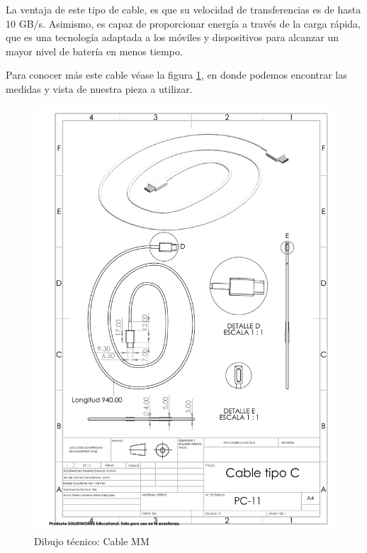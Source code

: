     La ventaja de este tipo de cable, es que su velocidad de transferencias es de hasta 10 GB/s. Asimismo, es capaz de proporcionar energía a través de la carga rápida, que es una tecnología adaptada a los móviles y dispositivos para alcanzar un mayor nivel de batería en menos tiempo.
    
    Para conocer más este cable véase la figura \ref{fig:cableC}, en donde podemos encontrar las medidas y vista de nuestra pieza a utilizar. 
    
    \begin{figure}[H]
        \centering
        \includegraphics[trim = {7mm 1mm 1mm 1mm},clip,scale=0.4]{22/Img/cableCDibujo.PDF}
        \caption{Dibujo técnico: Cable MM}
        \label{fig:cableC}
    \end{figure}
    

